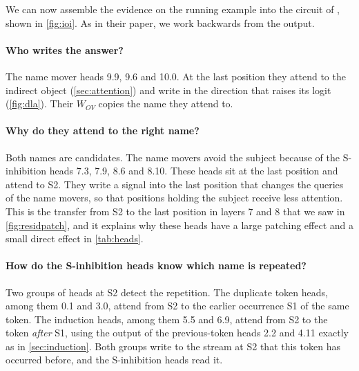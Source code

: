 We can now assemble the evidence on the running example into the circuit of \citet{wang2023interpretability},
shown in \cref{fig:ioi}. As in their paper, we work backwards from the output.

\paragraph{Who writes the answer?} The name mover heads 9.9, 9.6 and 10.0. At the last position they attend to
the indirect object (\cref{sec:attention}) and write in the direction that raises its logit (\cref{fig:dla}).
Their $W_{OV}$ copies the name they attend to.

\paragraph{Why do they attend to the right name?} Both names are candidates. The name movers avoid the subject
because of the S-inhibition heads 7.3, 7.9, 8.6 and 8.10. These heads sit at the last position and attend to
S2. They write a signal into the last position that changes the queries of the name movers, so that positions
holding the subject receive less attention. This is the transfer from S2 to the last position in layers 7 and 8
that we saw in \cref{fig:residpatch}, and it explains why these heads have a large patching effect and a small
direct effect in \cref{tab:heads}.

\paragraph{How do the S-inhibition heads know which name is repeated?} Two groups of heads at S2 detect the
repetition. The duplicate token heads, among them 0.1 and 3.0, attend from S2 to the earlier occurrence S1 of the
same token. The induction heads, among them 5.5 and 6.9, attend from S2 to the token \emph{after} S1, using the output of the
previous-token heads 2.2 and 4.11 exactly as in \cref{sec:induction}. Both groups write to the stream at S2 that
this token has occurred before, and the S-inhibition heads read it.

